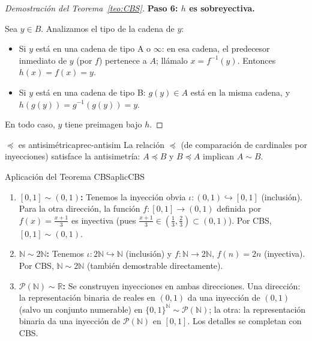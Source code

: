 \begin{proof}[Demostración del Teorema~\ref{teo:CBS}]
\medskip
\textbf{Paso 6: $h$ es sobreyectiva.}

Sea $y \in B$. Analizamos el tipo de la cadena de $y$:
\begin{itemize}[leftmargin=2em]
  \item Si $y$ está en una cadena de tipo A o $\infty$: en esa cadena, el predecesor inmediato de $y$ (por $f$) pertenece a $A$; llámalo $x = f^{-1}(y)$. Entonces $h(x) = f(x) = y$.
  \item Si $y$ está en una cadena de tipo B: $g(y) \in A$ está en la misma cadena, y $h(g(y)) = g^{-1}(g(y)) = y$.
\end{itemize}
En todo caso, $y$ tiene preimagen bajo $h$.
\end{proof}

\begin{corolario}{$\preceq$ es antisimétrica}{prec-antisim}
La relación $\preceq$ (de comparación de cardinales por inyecciones) satisface la antisimetría: $A \preceq B$ y $B \preceq A$ implican $A \sim B$.
\end{corolario}

\begin{ejemplo}{Aplicación del Teorema CBS}{aplicCBS}
\begin{enumerate}[leftmargin=2em, label=(\alph*)]
  \item \textbf{$[0,1] \sim (0,1)$:} Tenemos la inyección obvia $\iota: (0,1) \hookrightarrow [0,1]$ (inclusión). Para la otra dirección, la función $f: [0,1] \to (0,1)$ definida por $f(x) = \frac{x+1}{3}$ es inyectiva (pues $\frac{x+1}{3} \in (\frac{1}{3}, \frac{2}{3}) \subset (0,1)$). Por CBS, $[0,1] \sim (0,1)$.

  \item \textbf{$\mathbb{N} \sim 2\mathbb{N}$:} Tenemos $\iota: 2\mathbb{N} \hookrightarrow \mathbb{N}$ (inclusión) y $f: \mathbb{N} \to 2\mathbb{N}$, $f(n) = 2n$ (inyectiva). Por CBS, $\mathbb{N} \sim 2\mathbb{N}$ (también demostrable directamente).

  \item \textbf{$\mathcal{P}(\mathbb{N}) \sim \mathbb{R}$:} Se construyen inyecciones en ambas direcciones. Una dirección: la representación binaria de reales en $(0,1)$ da una inyección de $(0,1)$ (salvo un conjunto numerable) en $\{0,1\}^{\mathbb{N}} \sim \mathcal{P}(\mathbb{N})$; la otra: la representación binaria da una inyección de $\mathcal{P}(\mathbb{N})$ en $[0,1]$. Los detalles se completan con CBS.
\end{enumerate}
\end{ejemplo}

